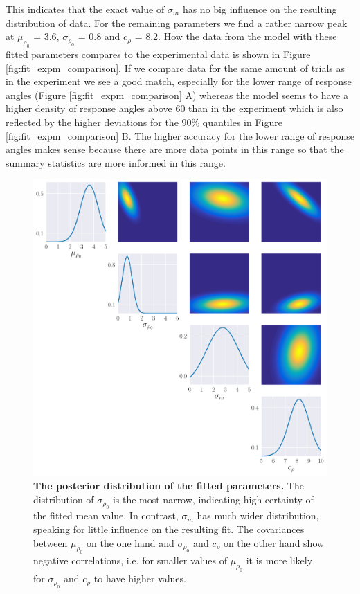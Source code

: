 \documentclass[a4paper,10pt,hidelinks]{scrreprt}
\begin{document}
    This indicates that the exact value of $\sigma_m$ has no big influence on the resulting distribution of data.
    For the remaining parameters we find a rather narrow peak at $\mu_{\rho_0}$ = 3.6, $\sigma_{\rho_0}$ = 0.8 and $c_{\rho}$ = 8.2.
    How the data from the model with these fitted parameters compares to the experimental data is shown in Figure \ref{fig:fit_expm_comparison}.
    If we compare data for the same amount of trials as in the experiment we see a good match, especially for the lower range of response angles (Figure \ref{fig:fit_expm_comparison} A) whereas the model seems to have a higher density of response angles above 60\textdegree{} than in the experiment which is also reflected by the higher deviations for the 90\% quantiles in Figure \ref{fig:fit_expm_comparison} B.
    The higher accuracy for the lower range of response angles makes sense because there are more data points in this range so that the summary statistics are more informed in this range.
    \begin{figure}[H]
    \begin{center}
    \includegraphics[width=\textwidth]{figure_expm_fit_posterior.pdf}
    \end{center}
    \caption{\textbf{The posterior distribution of the fitted parameters.} The distribution of $\sigma_{\rho_0}$ is the most narrow, indicating high certainty of the fitted mean value. In contrast, $\sigma_{m}$ has much wider distribution, speaking for little influence on the resulting fit. The covariances between $\mu_{\rho_0}$ on the one hand and $\sigma_{\rho_0}$ and $c_{\rho}$ on the other hand show negative correlations, i.e. for smaller values of $\mu_{\rho_0}$ it is more likely for $\sigma_{\rho_0}$ and $c_{\rho}$ to have higher values.}
    \label{fig:fit_expm_post}
    \end{figure}
    
\end{document}
